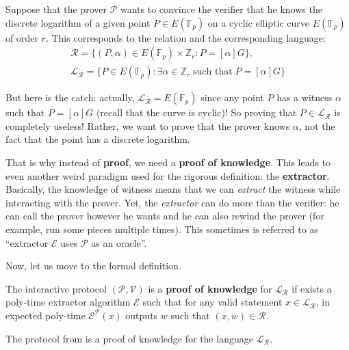 \documentclass[../lecture-notes.tex]{subfiles}
\begin{document}
\begin{example}
    Suppose that the prover $\mathcal{P}$ wants to convince the verifier that he knows the discrete logarithm of a given point $P \in E(\mathbb{F}_p)$ on a cyclic elliptic curve $E(\mathbb{F}_p)$ of order $r$. This corresponds to the relation and the corresponding language:
    \begin{align*}
        \mathcal{R} = \{(P, \alpha) \in E(\mathbb{F}_p) \times \mathbb{Z}_r: P = [\alpha] G\}, \\ \mathcal{L}_{\mathcal{R}} = \{P \in E(\mathbb{F}_p): \exists \alpha \in \mathbb{Z}_r \; \text{such that} \; P = [\alpha] G\}
    \end{align*}

    But here is the catch: actually, $\mathcal{L}_{\mathcal{R}} = E(\mathbb{F}_p)$ since any point $P$ has a witness $\alpha$ such that $P = [\alpha] G$ (recall that the curve is cyclic)! So proving that $P \in \mathcal{L}_{\mathcal{R}}$ is completely useless! Rather, we want to prove that the prover knows $\alpha$, not the fact that the point has a discrete logarithm.
\end{example}

That is why instead of \textbf{proof}, we need a \textbf{proof of knowledge}. This leads to even another weird paradigm used for the rigorous definition: the \textbf{extractor}. Basically, the knowledge of witness means that we can \textit{extract} the witness while interacting with the prover. Yet, the \textit{extractor} can do more than the verifier: he can call the prover however he wants and he can also rewind the prover (for example, run some pieces multiple times). This sometimes is referred to as ``extractor $\mathcal{E}$ uses $\mathcal{P}$ as an oracle''. 

Now, let us move to the formal definition.

\begin{definition}
    The interactive protocol $(\mathcal{P}, \mathcal{V})$ is a \textbf{proof of knowledge} for $\mathcal{L}_{\mathcal{R}}$ if exists a poly-time extractor algorithm $\mathcal{E}$ such that for any valid statement $x \in \mathcal{L}_{\mathcal{R}}$, in expected poly-time $\mathcal{E}^{\mathcal{P}}(x)$ outputs $w$ such that $(x,w) \in \mathcal{R}$.
\end{definition}

\begin{lemma}
    The protocol from  is a proof of knowledge for the language $\mathcal{L}_{\mathcal{R}}$. 
\end{lemma}
\end{document}
